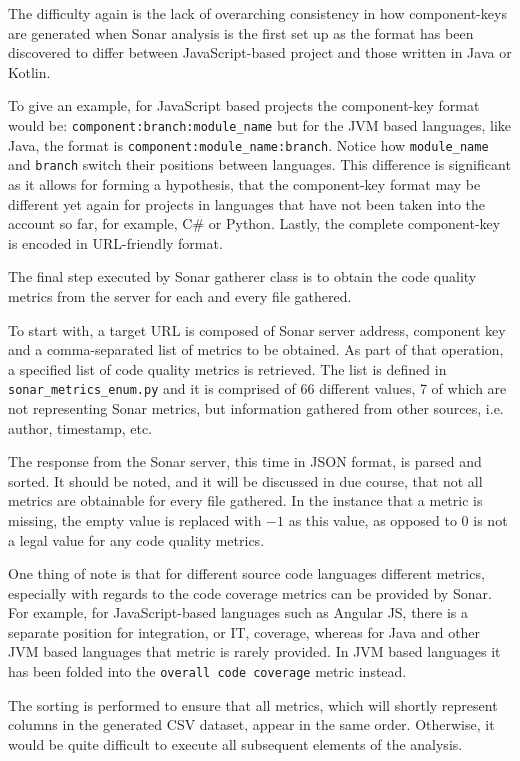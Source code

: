 The difficulty again is the lack of overarching consistency in how component-keys are generated when Sonar analysis is the first set up as the format has been discovered to differ between JavaScript-based project and those written in Java or Kotlin.

To give an example, for JavaScript based projects the component-key format would be:
\texttt{component:branch:module\_name} but for the JVM based languages, like Java, the format is
\texttt{component:module\_name:branch}.
Notice how \texttt{module\_name} and \texttt{branch} switch their positions between languages.
This difference is significant as it allows for forming a hypothesis, that the component-key format may be different yet again for projects in languages that have not been taken into the account so far, for example, C\# or Python.
Lastly, the complete component-key is encoded in URL-friendly format.

The final step executed by Sonar gatherer class is to obtain the code quality metrics from the server for each and every file gathered. 

To start with, a target URL is composed of Sonar server address, component key and a comma-separated list of metrics to be obtained. As part of that operation, a specified list of code quality metrics is retrieved. The list is defined in \texttt{sonar\_metrics\_enum.py} and it is comprised of 66 different values, 7 of which are not representing Sonar metrics, but information gathered from other sources, i.e. author, timestamp, etc. 

The response from the Sonar server, this time in JSON format, is parsed and sorted. It should be noted, and it will be discussed in due course, that not all metrics are obtainable for every file gathered. In the instance that a metric is missing, the empty value is replaced with $-1$ as this value, as opposed to $0$ is not a legal value for any code quality metrics. 

One thing of note is that for different source code languages different metrics, especially with regards to the code coverage metrics can be provided by Sonar. For example, for JavaScript-based languages such as Angular JS, there is a separate position for integration, or IT, coverage, whereas for Java and other JVM based languages that metric is rarely provided. In JVM based languages it has been folded into the \texttt{overall code coverage} metric instead.

The sorting is performed to ensure that all metrics, which will shortly represent columns in the generated CSV dataset, appear in the same order. Otherwise, it would be quite difficult to execute all subsequent elements of the analysis.

